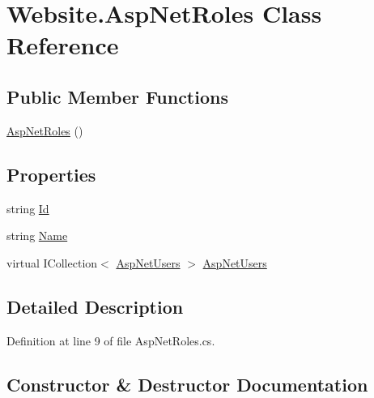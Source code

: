 \hypertarget{class_website_1_1_asp_net_roles}{}\section{Website.\+Asp\+Net\+Roles Class Reference}
\label{class_website_1_1_asp_net_roles}
\subsection*{Public Member Functions}
\begin{DoxyCompactItemize}
\item 
\hyperlink{class_website_1_1_asp_net_roles_a45b6495c8787ee041600586d75820201}{Asp\+Net\+Roles} ()
\end{DoxyCompactItemize}
\subsection*{Properties}
\begin{DoxyCompactItemize}
\item 
string \hyperlink{class_website_1_1_asp_net_roles_a826596f75f2900f840555d99954bf99a}{Id}
\item 
string \hyperlink{class_website_1_1_asp_net_roles_a8105ae80104e38efa31b5c5dfae4c672}{Name}
\item 
virtual I\+Collection$<$ \hyperlink{class_website_1_1_asp_net_users}{Asp\+Net\+Users} $>$ \hyperlink{class_website_1_1_asp_net_roles_a320673eb7e4021eb31024ad00d0b5e88}{Asp\+Net\+Users}
\end{DoxyCompactItemize}


\subsection{Detailed Description}


Definition at line 9 of file Asp\+Net\+Roles.\+cs.



\subsection{Constructor \& Destructor Documentation}
\hypertarget{class_website_1_1_asp_net_roles_a45b6495c8787ee041600586d75820201}{}
